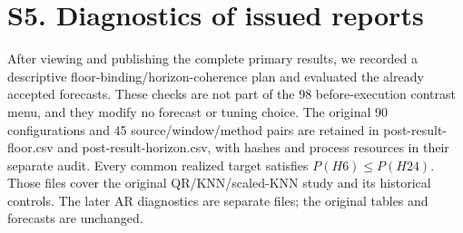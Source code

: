 \documentclass[11pt,a4paper]{article}
\begin{document}
\section*{S5. Diagnostics of issued reports}
After viewing and publishing the complete primary results, we recorded a descriptive floor-binding/horizon-coherence plan and evaluated the already accepted forecasts. These checks are not part of the 98 before-execution contrast menu, and they modify no forecast or tuning choice. The original 90 configurations and 45 source/window/method pairs are retained in post-result-floor.csv and post-result-horizon.csv, with hashes and process resources in their separate audit. Every common realized target satisfies \(P(H6)\le P(H24)\). Those files cover the original QR/KNN/scaled-KNN study and its historical controls. The later AR diagnostics are separate files; the original tables and forecasts are unchanged.
\end{document}
